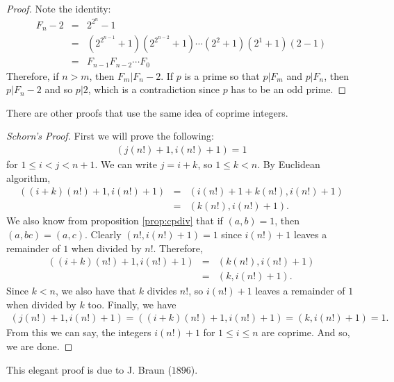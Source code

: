 \documentclass{subfiles}
\begin{document}
		\begin{proof}
			Note the identity:
			\begin{eqnarray*}
				F_n-2 & = & 2^{2^n}-1\\
					  & = & \left(2^{2^{n-1}}+1\right)\left(2^{2^{n-2}}+1\right)\cdots\left(2^2+1\right)(2^1+1)(2-1)\\
					  & = & F_{n-1}F_{n-2}\cdots F_{0}
			\end{eqnarray*}
			Therefore, if $n>m$, then $F_m|F_n-2$. If $p$ is a prime so that $p|F_m$ and $p|F_n$, then $p|F_n-2$ and so $p|2$, which is a contradiction since $p$ has to be an odd prime.
		\end{proof}
	There are other proofs that use the same idea of coprime integers.
		\begin{proof}[Schorn's Proof]
			First we will prove the following:
				\begin{align*}
					(j(n!)+1,i(n!)+1)=1
				\end{align*}
			for $1\leq i<j<n+1$. We can write $j=i+k$, so $1\leq k<n$. By Euclidean algorithm,
				\begin{eqnarray*}
					((i+k)(n!)+1,i(n!)+1) & = & (i(n!)+1+k(n!),i(n!)+1)\\
										  & = & (k(n!),i(n!)+1).
				\end{eqnarray*}
			We also know from proposition \eqref{prop:cpdiv} that if $(a,b)=1$, then $(a,bc)=(a,c)$. Clearly $(n!,i(n!)+1)=1$ since $i(n!)+1$ leaves a remainder of $1$ when divided by $n!$. Therefore,
				\begin{eqnarray*}
					((i+k)(n!)+1,i(n!)+1) & = & (k(n!),i(n!)+1)\\
										  & = & (k,i(n!)+1).
				\end{eqnarray*}
			Since $k<n$, we also have that $k$ divides $n!$, so $i(n!)+1$ leaves a remainder of $1$ when divided by $k$ too. Finally, we have 
				\begin{eqnarray*}
					(j(n!)+1,i(n!)+1) = ((i+k)(n!)+1,i(n!)+1) = (k,i(n!)+1) = 1.
				\end{eqnarray*}
			From this we can say, the integers $i(n!)+1$ for $1\leq i\leq n$ are coprime. And so, we are done.
		\end{proof}
	This elegant proof is due to J. Braun ($1896$).
\end{document}

